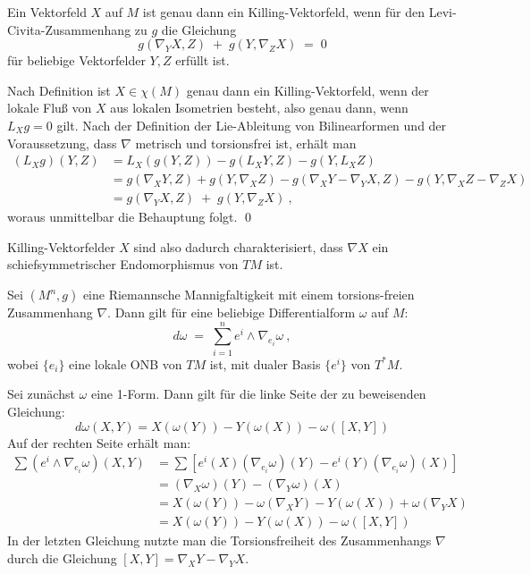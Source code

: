 \documentclass[%
	paper=a5,%
	fleqn,%
	DIV=18,%
	BCOR=0mm,
	fontsize=11pt,
	titlepage=false,%
	bibliography=totoc,
	DIV=18,%
	twoside=true,
	pdftitle=Riemannsche Geometrie,
	pdfauthor=Uwe Semmelmann,
	numbers=noendperiod]%
	{scrbook}
\begin{document}
\begin{Lemma}
Ein Vektorfeld $X$ auf $M$ ist genau dann ein Killing-Vektorfeld, wenn
f\"ur den Levi-Civita-Zusammenhang zu $g$ die Gleichung
$$
g(\nabla_YX, Z) \;+\; g(Y, \nabla_ZX) \;=\; 0
$$
f\"ur beliebige Vektorfelder $Y, Z$ erf\"ullt ist.\fish
\end{Lemma}
\proof
Nach Definition ist $X \in \chi(M)$ genau dann ein Killing-Vektorfeld, wenn
der lokale Flu\ss{} von $X$ aus lokalen Isometrien besteht, also genau dann,
wenn $L_Xg=0$ gilt. Nach der Definition der Lie-Ableitung von Bilinearformen
und der Voraussetzung, dass $\nabla$ metrisch und torsionsfrei ist, erh\"alt man
$$
\begin{array}{rl}
(L_X g)(Y,Z) & = L_X(g(Y,Z)) - g(L_XY, Z) - g(Y, L_XZ)\\[1.5ex]
& =
g(\nabla_XY, Z) + g(Y, \nabla_XZ) - g(\nabla_XY - \nabla_YX, Z) - g(Y, \nabla_XZ - \nabla_ZX)\\[1.5ex]
& =
g(\nabla_YX, Z) \;+\; g(Y, \nabla_ZX) \ ,
\end{array}
$$
woraus unmittelbar die Behauptung folgt.
\qed

\bigskip

\begin{rem*}
Killing-Vektorfelder $X$ sind also dadurch charakterisiert, dass $\nabla X$ ein schiefsymmetrischer
Endomorphismus von $TM$ ist.
\end{rem*}

\bigskip

\begin{Lemma}
Sei $(M^n, g)$ eine Riemannsche Mannigfaltigkeit mit einem torsions-freien Zusammenhang
$\nabla$. Dann gilt f\"ur eine beliebige Differentialform $\omega$ auf $M$:
$$
d\omega \;=\; \sum^n_{i=1} e^i \wedge \nabla_{e_i} \omega
\ ,
$$
wobei $\{e_i\}$ eine lokale ONB von $TM$ ist, mit dualer Basis $\{e^i\}$  von $T^*M$.\fish
\end{Lemma}
\proof
Sei zun\"achst $\omega$ eine 1-Form. Dann gilt f\"ur die linke Seite der zu beweisenden
Gleichung:
$$
d\omega (X,Y) = X(\omega(Y)) - Y(\omega(X)) - \omega([X,Y])
$$
Auf der rechten Seite erh\"alt man:
$$
\begin{array}{rl}
 \sum (e^i \wedge \nabla_{e_i} \omega)(X, Y)
& =
\sum [e^i(X)(\nabla_{e_i} \omega)(Y) - e^i(Y)(\nabla_{e_i} \omega)(X)] \\[1.5ex]
& =
(\nabla_X \omega)(Y) - (\nabla_Y \omega)(X) \\[1.5ex]
& =
X(\omega(Y)) - \omega(\nabla_XY) - Y(\omega(X)) + \omega(\nabla_YX) \\[1.5ex]
& =
 X(\omega(Y)) - Y(\omega(X)) - \omega([X,Y])
\end{array}
$$
In der letzten Gleichung nutzte man die Torsionsfreiheit des Zusammenhangs $\nabla$ durch
die Gleichung $[X, Y] = \nabla_XY - \nabla_YX$.
\end{document}
